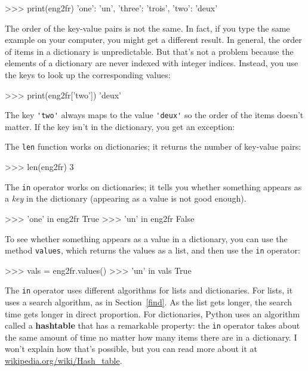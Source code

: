 \beforeverb
\begin{pyinterpreter}
>>> print(eng2fr)
{'one': 'un', 'three': 'trois', 'two': 'deux'}
\end{pyinterpreter}
\afterverb
%
The order of the key-value pairs is not the same.  In fact, if
you type the same example on your computer, you might get a
different result.  In general, the order of items in
a dictionary is unpredictable.
But that's not a problem because
the elements of a dictionary are never indexed with integer indices.
Instead, you use the keys to look up the corresponding values:

\beforeverb
\begin{pyinterpreter}
>>> print(eng2fr['two'])
'deux'
\end{pyinterpreter}
\afterverb
%
The key \verb"'two'" always maps to the value \verb"'deux'" so the order
of the items doesn't matter.
If the key isn't in the dictionary, you get an exception:


\beforeverb
{}
\afterverb
%
The {\tt len} function works on dictionaries; it returns the
number of key-value pairs:


\beforeverb
\begin{pyinterpreter}
>>> len(eng2fr)
3
\end{pyinterpreter}
\afterverb
%
The {\tt in} operator works on dictionaries; it tells you whether
something appears as a {\em key} in the dictionary (appearing
as a value is not good enough).


\beforeverb
\begin{pyinterpreter}
>>> 'one' in eng2fr
True
>>> 'un' in eng2fr
False
\end{pyinterpreter}
\afterverb
%
To see whether something appears as a value in a dictionary, you
can use the method {\tt values}, which returns the values as
a list, and then use the {\tt in} operator:


\beforeverb
\begin{pyinterpreter}
>>> vals = eng2fr.values()
>>> 'un' in vals
True
\end{pyinterpreter}
\afterverb
%
The {\tt in} operator uses different algorithms for lists and
dictionaries.  For lists, it uses a search algorithm, as in {\color{red}
Section~\ref{find}}.  As the list gets longer, the search time gets
longer in direct proportion.  For dictionaries, Python uses an
algorithm called a {\bf hashtable} that has a remarkable property: the
{\tt in} operator takes about the same amount of time no matter how
many items there are in a dictionary.  I won't explain how that's
possible, but you can read more about it at
\url{wikipedia.org/wiki/Hash_table}.

